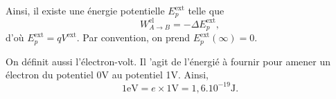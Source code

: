         Ainsi, il existe une énergie potentielle $E_{p}^{\text{ext}}$ telle que 
        \begin{equation*}
            W_{A\to B}^{\text{el}}=-\Delta E_{p}^{\text{ext}},
        \end{equation*}
        d'où $E_{p}^{\text{ext}}=qV^{\text{ext}}$. Par convention, on prend $E_p^{\text{ext}}(\infty)=0$.

        On définit aussi l'électron-volt. Il 'agit de l'énergié à fournir pour amener un électron du potentiel 0\si{\volt} au potentiel 1\si{\volt}. Ainsi, 
        \begin{equation*}
            \boxed{
                1\si{\electronvolt}=e\times1\si{\volt}=1,6.10^{-19}\si{\joule}.
            }
        \end{equation*}        